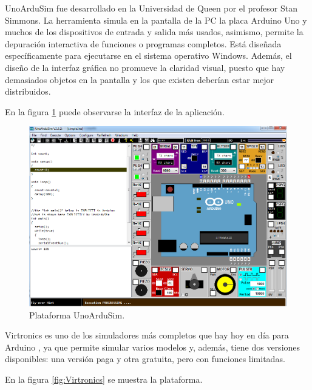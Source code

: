 UnoArduSim \citep{UnoArduSim} fue desarrollado en la Universidad de Queen \citep{Queensu} por el profesor Stan Simmons. La herramienta simula en la pantalla de la PC la placa Arduino Uno \citep{ArduinoUno} y muchos de los dispositivos de entrada y salida más usados, asimismo, permite la depuración interactiva de funciones o programas completos. Está diseñada específicamente para ejecutarse en el sistema operativo Windows. Además, el diseño de la interfaz gráfica no promueve la claridad visual, puesto que hay demasiados objetos en la pantalla y los que existen deberían estar mejor distribuidos. 

En la figura \ref{fig:UnoArduSim} puede observarse la interfaz de la aplicación.

\begin{figure}[ht]
	\centering
	\includegraphics[scale=.33]{./Figures/UnoArduSim.png}
	\caption{Plataforma UnoArduSim.}
	\label{fig:UnoArduSim}
\end{figure}



Virtronics \citep{Virtronics} es uno de los simuladores más completos que hay hoy en día para Arduino \citep{Arduino}, ya que permite simular varios modelos y, además, tiene dos versiones disponibles: una versión paga y otra gratuita, pero con funciones limitadas. 

En la figura \ref{fig:Virtronics} se muestra la plataforma.

